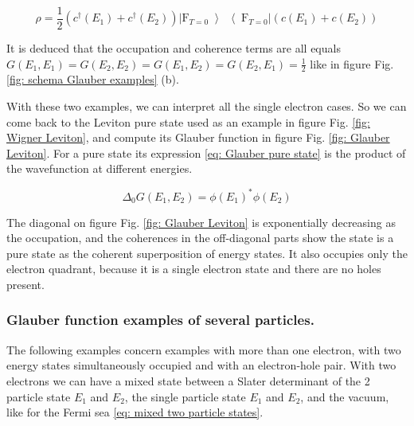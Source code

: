 \begin{equation}
\rho = \frac{1}{2}\left(c^{\dagger}\left(E_{1}\right)+c^{\dagger}\left(E_{2}\right)\right)\left|\mathrm{F}_{T=0}\left>\right<\mathrm{F}_{T=0}\right|\left(c\left(E_{1}\right)+c\left(E_{2}\right)\right) \label{eq: coherent superposition}
\end{equation}

It is deduced that the occupation and coherence terms are all equals $G(E_1,E_1) = G(E_2,E_2) = G(E_1,E_2) = G(E_2,E_1) = \frac{1}{2}$ like in figure Fig. \ref{fig: schema Glauber examples} (b).

With these two examples, we can interpret all the single electron cases.
So we can come back to the Leviton pure state used as an example in figure Fig. \ref{fig: Wigner Leviton}, and compute its Glauber function in figure Fig. \ref{fig: Glauber Leviton}.
For a pure state its expression \eqref{eq: Glauber pure state} is the product of the wavefunction at different energies.

\begin{equation}
\Delta_{0}G\left(E_1,E_2\right) = \phi\left(E_{1}\right)^{\ast}\phi\left(E_{2}\right) \label{eq: Glauber pure state}
\end{equation}

The diagonal on figure Fig. \ref{fig: Glauber Leviton} is exponentially decreasing as the occupation, and the coherences in the off-diagonal parts show the state is a pure state as the coherent superposition of energy states.
It also occupies only the electron quadrant, because it is a single electron state and there are no holes present.

\subsubsection*{Glauber function examples of several particles.}

The following examples concern examples with more than one electron, with two energy states simultaneously occupied and with an electron-hole pair.
With two electrons we can have a mixed state between a Slater determinant of the 2 particle state $E_1$ and $E_2$, the single particle state $E_1$ and $E_2$, and the vacuum, like for the Fermi sea \eqref{eq: mixed two particle states}.


